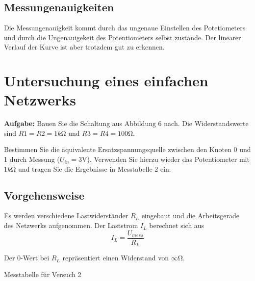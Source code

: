 \documentclass[10pt]{report}
\begin{document}
        \subsection{Messungenauigkeiten}
        Die Messungenauigkeit kommt durch das ungenaue Einstellen des Potetiometers
        und durch die Ungenauigekeit des Potentiometers selbst zustande. Der linearer Verlauf der Kurve ist aber trotzdem gut zu erkennen.


        \section{Untersuchung eines einfachen Netzwerks}
        \textbf{Aufgabe: }Bauen Sie die Schaltung aus Abbildung 6 nach. Die Widerstandswerte sind $R1 = R2 =
        1 \si{k\ohm}$ und $R3 = R4 = 100\si{\ohm}$.

        Bestimmen Sie die äquivalente Ersatzspannungsquelle zwischen den Knoten 0 und 1 durch
        Messung ($U_{in} = 3\si{\volt}$). Verwenden Sie hierzu wieder das Potentiometer mit $1\si{k\ohm}$ und tragen
        Sie die Ergebnisse in Messtabelle 2 ein.

        \subsection{Vorgehensweise}
        Es werden verschiedene Lastwiderständer $R_L$ eingebaut und die Arbeitsgerade
        des Netzwerks aufgenommen. Der Laststrom $I_L$ berechnet sich aus
        \begin{equation*}
            I_L = \frac{U_{mess}}{R_L}
        \end{equation*}


        \vspace{0.5cm}

        Der $0$-Wert bei $R_L$ repräsentiert einen Widerstand von $\infty \si{\ohm}$.
        \begin{table}[H]
            \begin{center}
                \caption{Messtabelle für Versuch 2}
                \label{tableb}
            \end{center}
        \end{table}
\end{document}
